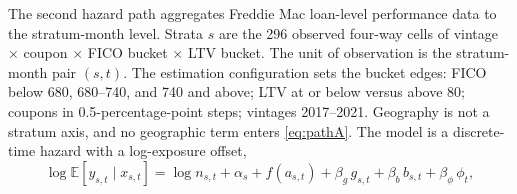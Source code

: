 \documentclass[12pt]{article}
\begin{document}
The second hazard path aggregates Freddie Mac loan-level performance data to the stratum-month level. Strata $s$ are the 296 observed four-way cells of vintage $\times$ coupon $\times$ FICO bucket $\times$ LTV bucket. The unit of observation is the stratum-month pair $(s,t)$. The estimation configuration sets the bucket edges: FICO below 680, 680--740, and 740 and above; LTV at or below versus above 80; coupons in 0.5-percentage-point steps; vintages 2017--2021. Geography is not a stratum axis, and no geographic term enters \eqref{eq:pathA}. The model is a discrete-time hazard with a log-exposure offset,
\begin{equation}\label{eq:pathA}
\log \mathbb{E}\!\left[y_{s,t} \mid x_{s,t}\right] = \log n_{s,t} + \alpha_{s} + f\!\left(a_{s,t}\right) + \beta_g\, g_{s,t} + \beta_b\, b_{s,t} + \beta_\phi\, \phi_t ,
\end{equation}
\end{document}

